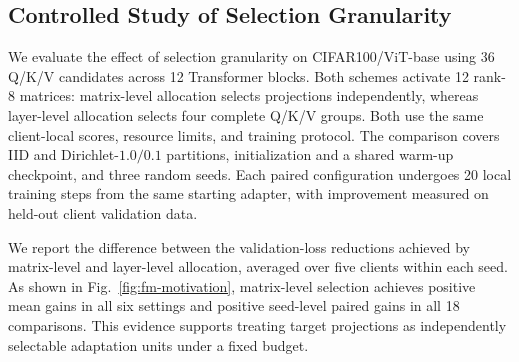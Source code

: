\documentclass[10pt,conference,letterpaper]{IEEEtran}
\newcommand{\method}{FedMATRIX-LoRA}
\begin{document}
\begin{table}[!t]
\centering
\caption{Resources required to match each strongest baseline's peak Accuracy; positive savings favor \method{}.}
\label{tab:time-to-quality}
\setlength{\tabcolsep}{2.2pt}
\end{table}

\subsection{Controlled Study of Selection Granularity}
\label{sec:fm-granularity-study}
We evaluate the effect of selection granularity on CIFAR100/ViT-base using 36 Q/K/V candidates across 12 Transformer blocks. Both schemes activate 12 rank-8 matrices: matrix-level allocation selects projections independently, whereas layer-level allocation selects four complete Q/K/V groups. Both use the same client-local scores, resource limits, and training protocol. The comparison covers IID and Dirichlet-$1.0/0.1$ partitions, initialization and a shared warm-up checkpoint, and three random seeds. Each paired configuration undergoes 20 local training steps from the same starting adapter, with improvement measured on held-out client validation data.

We report the difference between the validation-loss reductions achieved by matrix-level and layer-level allocation, averaged over five clients within each seed. As shown in Fig.~\ref{fig:fm-motivation}, matrix-level selection achieves positive mean gains in all six settings and positive seed-level paired gains in all 18 comparisons. This evidence supports treating target projections as independently selectable adaptation units under a fixed budget.
\end{document}

